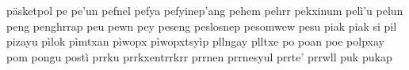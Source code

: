 päsketpol\hspace{2mm}
pe\hspace{2mm}
pe'un\hspace{2mm}
pefnel\hspace{2mm}
pefya\hspace{2mm}
pefyinep'ang\hspace{2mm}
pehem\hspace{2mm}
pehrr\hspace{2mm}
pekxinum\hspace{2mm}
pelì'u\hspace{2mm}
pelun\hspace{2mm}
peng\hspace{2mm}
penghrrap\hspace{2mm}
peu\hspace{2mm}
pewn\hspace{2mm}
pey\hspace{2mm}
peseng\hspace{2mm}
peslosnep\hspace{2mm}
pesomwew\hspace{2mm}
pesu\hspace{2mm}
piak\hspace{2mm}
piak si\hspace{2mm}
pil\hspace{2mm}
pizayu\hspace{2mm}
pìlok\hspace{2mm}
pìmtxan\hspace{2mm}
pìwopx\hspace{2mm}
pìwopxtsyìp\hspace{2mm}
pllngay\hspace{2mm}
plltxe\hspace{2mm}
po\hspace{2mm}
poan\hspace{2mm}
poe\hspace{2mm}
polpxay\hspace{2mm}
pom\hspace{2mm}
pongu\hspace{2mm}
postì\hspace{2mm}
prrku\hspace{2mm}
prrkxentrrkrr\hspace{2mm}
prrnen\hspace{2mm}
prrnesyul\hspace{2mm}
prrte'\hspace{2mm}
prrwll\hspace{2mm}
puk\hspace{2mm}
pukap\hspace{2mm}
